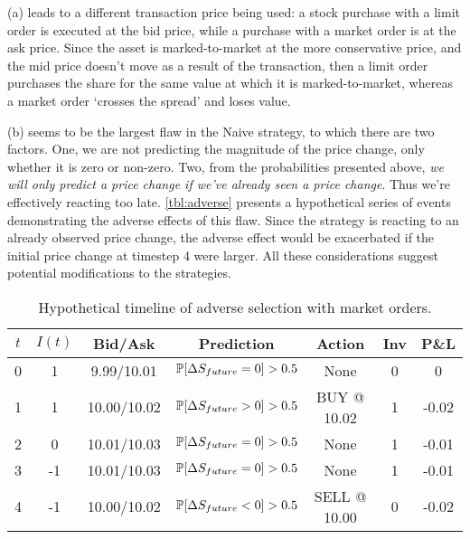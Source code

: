 (a) leads to a different transaction price being used: a stock purchase with a limit order is executed at the bid price, while a purchase with a market order is at the ask price. Since the asset is marked-to-market at the more conservative price, and the mid price doesn't move as a result of the transaction, then a limit order purchases the share for the same value at which it is marked-to-market, whereas a market order `crosses the spread' and loses value.

(b) seems to be the largest flaw in the Naive strategy, to which there are two factors. One, we are not predicting the magnitude of the price change, only whether it is zero or non-zero. Two, from the probabilities presented above, \emph{we will only predict a price change if we've already seen a price change}. Thus we're effectively reacting too late. \autoref{tbl:adverse} presents a hypothetical series of events demonstrating the adverse effects of this flaw. Since the strategy is reacting to an already observed price change, the adverse effect would be exacerbated if the initial price change at timestep 4 were larger. All these considerations suggest potential modifications to the strategies.

\begin{table}
\centering
{}
\begin{tabular}{@{} *{7}{c} @{}}
\toprule
$t$ & $I(t)$ & Bid/Ask & Prediction & Action & Inv & P\&L \\
\midrule
0 & 1 & \hphantom{1}9.99/10.01 & $\P[\Delta S_{future} = 0] > 0.5$ & None & 0 & 0 \\
1 & 1 & 10.00/10.02 & $\P[\Delta S_{future} > 0] > 0.5$ & BUY @ 10.02 & 1 & -0.02 \\
2 & 0 & 10.01/10.03 & $\P[\Delta S_{future} = 0] > 0.5$ & None & 1 & -0.01 \\
3 & -1 & 10.01/10.03 & $\P[\Delta S_{future} = 0] > 0.5$ & None & 1 & -0.01 \\
4 & -1 & 10.00/10.02 & $\P[\Delta S_{future} < 0] > 0.5$ & SELL @ 10.00 & 0 & -0.02 \\
\bottomrule
\end{tabular}
\caption{Hypothetical timeline of adverse selection with market orders.}
\label{tbl:adverse}
\end{table}